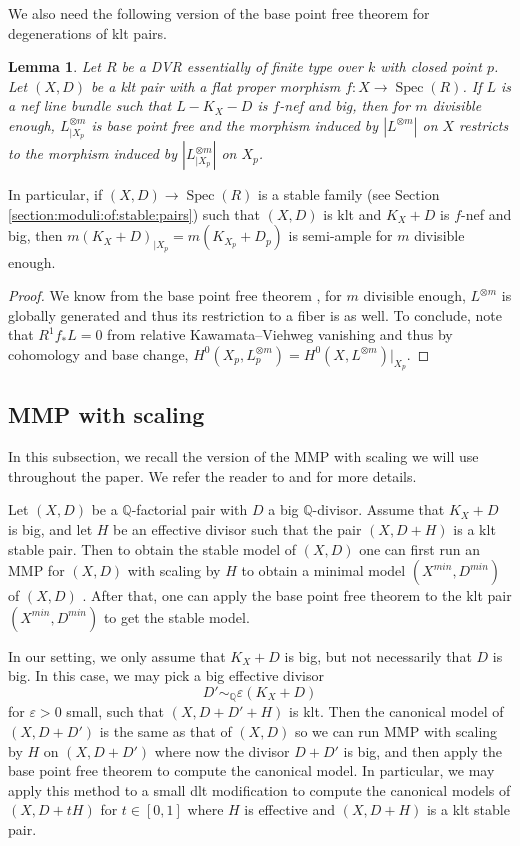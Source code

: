 \documentclass[11pt]{amsart}
\newtheorem{lemma}[theorem]{Lemma}
\theoremstyle{definition}
\theoremstyle{remark}
\newcommand{\Q}{{\mathbb Q}}
\newcommand{\Spec}{\operatorname{Spec}}
\begin{document}
	We also need the following version of the base point free theorem for degenerations of klt pairs.
	\begin{lemma}\label{lemma:bpf:thm}
		Let $R$ be a DVR essentially of finite type over $k$ with closed point $p$. Let $(X,D)$ be a klt pair with a flat proper morphism $f:X \to \Spec(R)$. If $L$ is a nef line bundle such that $L-K_X-D$ is $f$-nef and big, then for $m$ divisible enough, $L_{|X_p}^{\otimes m}$ is base point free and the morphism induced by $|L^{\otimes m}|$ on $X$ restricts to the morphism induced by $\left|L_{|X_p}^{\otimes m}\right|$ on $X_p$.
	\end{lemma}
	In particular, if $(X,D) \to \Spec(R)$ is a stable family (see Section \ref{section:moduli:of:stable:pairs}) such that $(X,D)$ is klt and $K_X+D$ is $f$-nef and big, then $m(K_{X}+D)_{|X_p}=m(K_{X_p}+D_p)$ is semi-ample for $m$ divisible enough. 
	\begin{proof}
		We know from the base point free theorem \cite[Theorem 6-1-13]{KMM}, for $m$ divisible enough, $L^{\otimes m}$ is globally generated and thus its restriction to a fiber is as well.
		To conclude, note that $R^1f_*L = 0$ from relative Kawamata--Viehweg vanishing and thus by cohomology and base change, $H^0(X_p, L_p^{\otimes m}) = H^0(X, L^{\otimes m})|_{X_p}$. 
	\end{proof}
	
	\subsection{MMP with scaling}\label{subsection:mmpscaling} In this subsection, we recall the version of the MMP with scaling we will use throughout the paper.
	We refer the reader to \cite{HK10} and \cite{BCHM10} for more details.
	
	Let $(X,D)$ be a $\mathbb{Q}$-factorial pair with $D$ a big $\mathbb{Q}$-divisor. Assume that $K_X+D$ is big, and let $H$ be an effective divisor such that the pair $(X,D+H)$ is a klt stable pair.
	Then to obtain the stable model of $(X,D)$ one can first run an MMP for $(X,D)$ with scaling by $H$ to obtain a minimal model $(X^{min}, D^{min})$ of $(X, D)$ \cite[Corollary 1.4.2]{BCHM10}.
	After that, one can apply the base point free theorem to the klt pair $(X^{min}, D^{min})$ to get the stable model. 
	
	In our setting, we only assume that $K_X + D$ is big, but not necessarily that $D$ is big. In this case, we may pick a big effective divisor 
	$$
	D' \sim_{\Q} \varepsilon(K_X + D)
	$$
	for $\varepsilon > 0$ small, such that $(X, D + D' + H)$ is klt. Then the canonical model of $(X, D + D')$ is the same as that of $(X,D)$ so we can run MMP with scaling by $H$ on $(X,D + D')$ where now the divisor $D + D'$ is big, and then apply the base point free theorem to compute the canonical model. In particular, we may apply this method to a small dlt modification to compute the canonical models of $(X, D + tH)$ for $t \in [0,1]$ where $H$ is effective and $(X, D + H)$ is a klt stable pair. 
	
\end{document}
